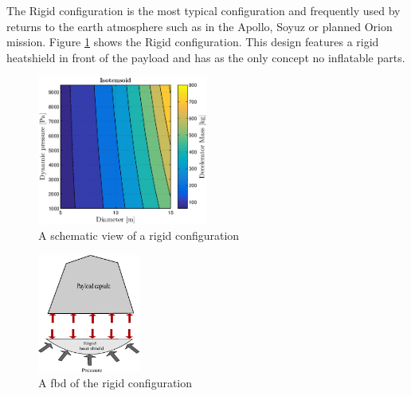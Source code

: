 The Rigid configuration is the most typical configuration and frequently used by returns to the earth atmosphere such as in the Apollo, Soyuz or planned Orion mission. Figure \ref{fig:conc_rigid} shows the Rigid configuration. This design features a rigid heatshield in front of the payload and has as the only concept no inflatable parts.

\begin{figure}[H]
\centering
\includegraphics[width = 0.5\textwidth]{Figure/ISO_comp.eps}
\caption{A schematic view of a rigid configuration}
\label{fig:conc_rigid}
\end{figure}

\begin{figure}[H]
\centering
\includegraphics[width = 0.3\textwidth]{Figure/FBD_rigid.eps}
\caption{A \gls{fbd} of the rigid configuration}
\label{fig:fbd_rigid}
\end{figure}

\
